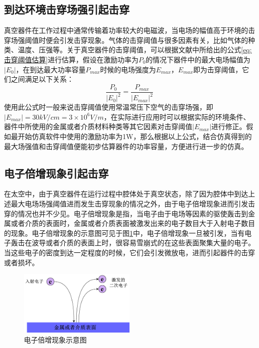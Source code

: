 \documentclass[master]{thesis-uestc}
\begin{document}
\subsection{到达环境击穿场强引起击穿}
真空器件在工作过程中通常传输着功率较大的电磁波，当电场的幅值高于环境的击穿场强阈值时便会引发击穿现象。气体的击穿阈值与很多因素有关，比如气体的种类、温度、压强等。关于真空器件的击穿阈值，可以根据文献\cite{chaiyuanyuan_window_2016}中所给出的公式\ref{eq:击穿阈值估算}进行估算，假设在激励功率为\(P_0\)的情况下器件中的最大电场幅值为\(\left| E_0 \right|\)，在到达最大功率容量\(P_{max}\)时候的电场强度为\(E_{max}\)，\(E_{max}\)即为击穿阈值，它们之间满足以下关系：
\begin{equation}\label{eq:击穿阈值估算}
    \frac{P_0}{\left|E_0\right|^2}=\frac{P_{max}}{\left|E_{max}\right|^2}
\end{equation}
使用此公式时一般来说击穿阈值使用常温常压下空气的击穿场强，即\(\left|E_{max}\right| = 30kV/cm = 3 \times 10^6V/m\)，在实际进行应用时可以根据实际的环境条件、器件中所使用的金属或者介质材料种类等其它因素对击穿阈值\(\left|E_{max}\right|\)进行修正。假如最开始仿真软件中使用的激励功率为1W，那么根据以上公式，结合仿真得到的最大场强值和击穿阈值便能初步估算器件的功率容量，方便进行进一步的仿真。

\subsection{电子倍增现象引起击穿}\label{subsec:电子倍增现象理论}
在太空中，由于真空器件在运行过程中腔体处于真空状态，除了因为腔体中到达上述最大电场场强阈值进而发生击穿现象的情况之外，由于电子倍增现象进而引发击穿的情况也并不少见。电子倍增现象是指，当电子由于电场等因素的驱使轰击到金属或者介质的表面时，金属或者介质表面被激发出来的电子数目大于入射电子数目的现象。电子倍增现象的示意图可见于图\ref{fig:二次电子发射示意图}中，电子倍增现象一旦被引发，当有电子轰击在波导或者介质的表面上时，很容易雪崩式的在这些表面聚集大量的电子。当这些电子的密度到达一定程度的时候，它们会引发微放电，进而引起器件的击穿或者损坏。
\begin{figure}[!htb]
    \centering
    \includegraphics[width=0.5\textwidth]{pic/chapter2/二次电子发射示意图.png}
    \caption{电子倍增现象示意图}
    \label{fig:二次电子发射示意图}
\end{figure}
\end{document}
